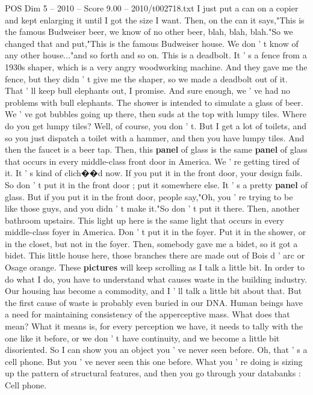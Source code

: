 \begin{textsample}{POS Dim 5 – 2010 – Score 9.00 – 2010/t002718.txt}
I just put a can on a copier and kept enlarging it until I got the size I want.
Then, on the can it says,"This is the famous Budweiser beer, we know of no other beer, blah, blah, blah."So we changed that and put,"This is the famous Budweiser house.
We don ' t know of any other house..."and so forth and so on.
This is a deadbolt.
It ' s a fence from a 1930s shaper, which is a very angry woodworking machine.
And they gave me the fence, but they didn ' t give me the shaper, so we made a deadbolt out of it.
That ' ll keep bull elephants out, I promise.
And sure enough, we ' ve had no problems with bull elephants.
The shower is intended to simulate a glass of beer.
We ' ve got bubbles going up there, then suds at the top with lumpy tiles.
Where do you get lumpy tiles?
Well, of course, you don ' t.
But I get a lot of toilets, and so you just dispatch a toilet with a hammer, and then you have lumpy tiles.
And then the faucet is a beer tap.
Then, this \textbf{panel} of glass is the same \textbf{panel} of glass that occurs in every middle-class front door in America.
We ' re getting tired of it.
It ' s kind of clich{\EmojiFont �}{\EmojiFont �}d now.
If you put it in the front door, your design fails.
So don ' t put it in the front door ; put it somewhere else.
It ' s a pretty \textbf{panel} of glass.
But if you put it in the front door, people say,"Oh, you ' re trying to be like those guys, and you didn ' t make it."So don ' t put it there.
Then, another bathroom upstairs.
This light up here is the same light that occurs in every middle-class foyer in America.
Don ' t put it in the foyer.
Put it in the shower, or in the closet, but not in the foyer.
Then, somebody gave me a bidet, so it got a bidet.
This little house here, those branches there are made out of Bois d ' arc or Osage orange.
These \textbf{pictures} will keep scrolling as I talk a little bit.
In order to do what I do, you have to understand what causes waste in the building industry.
Our housing has become a commodity, and I ' ll talk a little bit about that.
But the first cause of waste is probably even buried in our DNA.
Human beings have a need for maintaining consistency of the apperceptive mass.
What does that mean?
What it means is, for every perception we have, it needs to tally with the one like it before, or we don ' t have continuity, and we become a little bit disoriented.
So I can show you an object you ' ve never seen before.
Oh, that ' s a cell phone.
But you ' ve never seen this one before.
What you ' re doing is sizing up the pattern of structural features, and then you go through your databanks : Cell phone.

\end{textsample}
